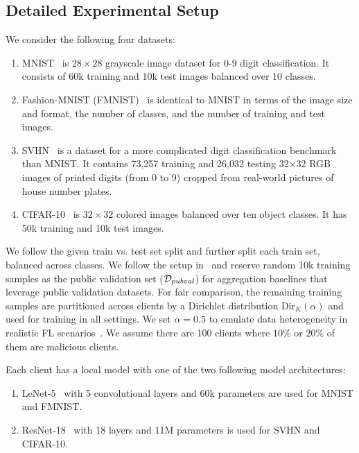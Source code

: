 \subsection{Detailed Experimental Setup}
\label{app:setup}


We consider the following four datasets:
\begin{enumerate}
    \item MNIST~\cite{lecun2010mnist} is $28\times28$ grayscale image dataset for 0-9 digit classification. It consists of 60k training and 10k test images balanced over 10 classes.
    \item Fashion-MNIST (FMNIST)~\cite{fmnist} is identical to MNIST in terms of the image size and format, the number of classes, and the number of training and test images.
    \item SVHN~\cite{svhn} is a dataset for a more complicated digit classification benchmark than MNIST. It contains 73,257 training and 26,032 testing 32×32 RGB images of printed digits (from 0 to 9) cropped from real-world pictures of house number plates.

    \item CIFAR-10~\cite{cifar10} is $32\times32$ colored images balanced over ten object classes. It has 50k training and 10k test images.
\end{enumerate}
We follow the given train vs. test set split and further split each train set, balanced across classes. We follow the setup in~\cite{CCS:CGJv22} and reserve random 10k training samples as the public validation set ($\mathcal{D}_{pubval}$) for aggregation baselines that leverage public validation datasets. For fair comparison, the remaining training samples are partitioned across clients by a Dirichlet distribution $\text{Dir}_K(\alpha)$ and used for training in all settings. We set $\alpha = 0.5$ to emulate data heterogeneity in realistic FL scenarios~\cite{cao2020fltrust}.
We assume there are 100 clients where $10\%$ or $20\%$ of them are malicious clients.

 Each client has a local model with one of the two following model architectures:
\begin{enumerate}
    \item LeNet-5~\cite{lecun1998gradient} with 5 convolutional layers and 60k parameters are used for MNIST and FMNIST.
    \item ResNet-18~\cite{resnet} with 18 layers and 11M parameters is used for SVHN and CIFAR-10.
\end{enumerate}

